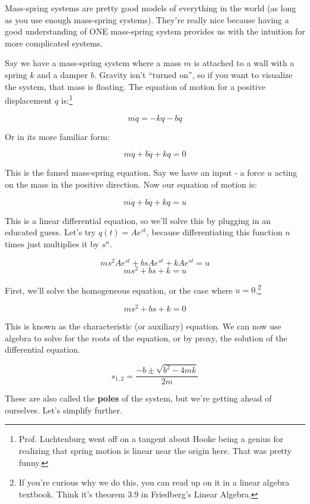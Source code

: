 \documentclass{report}
\begin{document}
\begin{onehalfspacing}
\begin{flushleft}
Mass-spring systems are pretty good models of everything in the world (as long as you use enough mass-spring systems). They're really nice because having a good understanding of ONE mass-spring system provides us with the intuition for more complicated systems. 

\medskip

Say we have a mass-spring system where a mass \(m\) is attached to a wall with a spring \(k\) and a damper \(b\). Gravity isn't ``turned on'', so if you want to visualize the system, that mass is floating. The equation of motion for a positive displacement \(q\) is:\footnote{Prof. Luchtenburg went off on a tangent about Hooke being a genius for realizing that spring motion is linear near the origin here. That was pretty funny.}

\vspace{-0.1in}
\[m\ddot{q} = -kq - b\dot{q}\]

Or in its more familiar form:

\vspace{-0.1in}
\[m\ddot{q} + b\dot{q} + kq = 0\]

This is the famed mass-spring equation. Say we have an input - a force \(u\) acting on the mass in the positive direction. Now our equation of motion is:

\vspace{-0.1in}
\[m\ddot{q} + b\dot{q} + kq = u\]

This is a linear differential equation, so we'll solve this by plugging in an educated guess. Let's try \(q(t) = Ae^{st}\), because differentiating this function \(n\) times just multiplies it by \(s^n\).

\vspace{-0.1in}
\[ms^2 Ae^{st} + bs Ae^{st} + kAe^{st} = u\]
\[ms^2 + bs + k = u\]

First, we'll solve the homogeneous equation, or the case where \(u=0\).\footnote{If you're curious why we do this, you can read up on it in a linear algebra textbook. Think it's theorem 3.9 in Friedberg's Linear Algebra.}

\[ms^2 + bs + k = 0\]

This is known as the characteristic (or auxiliary) equation. We can now use algebra to solve for the roots of the equation, or by proxy, the solution of the differential equation.

\[s_{1, 2} = \frac{-b \pm \sqrt{b^2 - 4mk}}{2m}\]

These are also called the \textbf{poles} of the system, but we're getting ahead of ourselves. Let's simplify further.


\end{flushleft}
\end{onehalfspacing}
\end{document}

